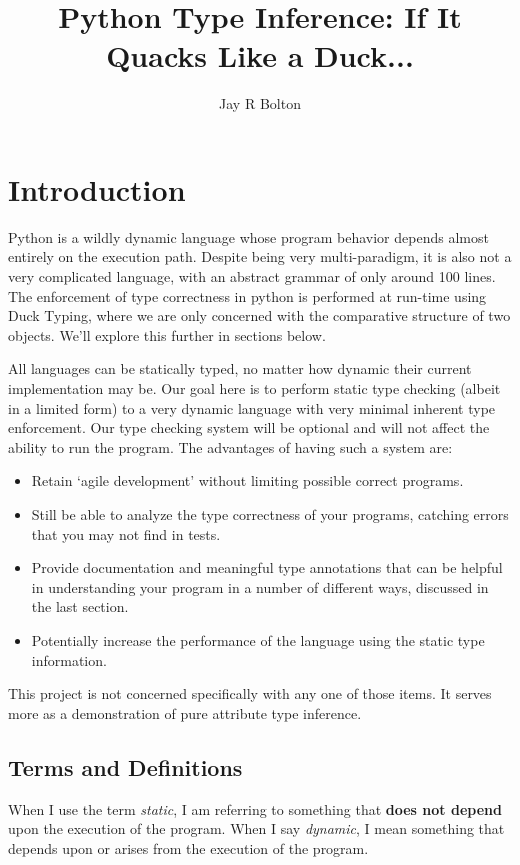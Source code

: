 \documentclass{article}
\title{Python Type Inference: If It Quacks Like a Duck...}
\author{Jay R Bolton}
\begin{document}
\maketitle

\section*{Introduction}

Python is a wildly dynamic language whose program behavior depends almost
entirely on the execution path. Despite being very multi-paradigm, it is also
not a very complicated language, with an abstract grammar of only around 100
lines. The enforcement of type correctness in python is performed at run-time
using Duck Typing, where we are only concerned with the comparative structure
of two objects. We'll explore this further in sections below.

All languages can be statically typed, no matter how dynamic their current
implementation may be. Our goal here is to perform static type checking (albeit
in a limited form) to a very dynamic language with very minimal inherent type
enforcement. Our type checking system will be optional and will not affect the
ability to run the program. The advantages of having such a system are:

\begin{itemize}
\item Retain `agile development' without limiting possible correct programs.
\item Still be able to analyze the type correctness of your programs, catching errors that you may not find in tests.
\item Provide documentation and meaningful type annotations that can be helpful
in understanding your program in a number of different ways, discussed in the
last section.
\item Potentially increase the performance of the language using the static type information.
\end{itemize}

This project is not concerned specifically with any one of those items. It
serves more as a demonstration of pure attribute type inference.

\subsection*{Terms and Definitions}

When I use the term \emph{static}, I am referring to something that
\textbf{does not depend} upon the execution of the program. When I say
\emph{dynamic}, I mean something that depends upon or arises from the execution
of the program.
\end{document}
